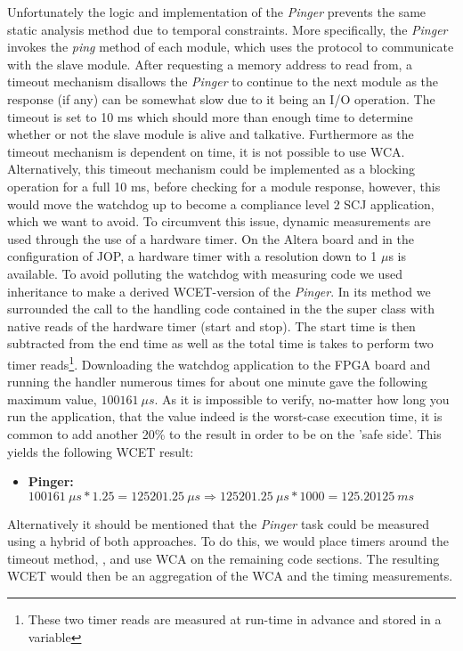 Unfortunately the logic and implementation of the \textit{Pinger} prevents the same static analysis method due to temporal constraints. More specifically, the \textit{Pinger} invokes the \textit{ping} method of each module, which uses the \iic protocol to communicate with the slave module. After requesting a memory address to read from, a timeout mechanism disallows the \textit{Pinger} to continue to the next module as the response (if any) can be somewhat slow due to it being an I/O operation. The timeout is set to 10 ms which should more than enough time to determine whether or not the slave module is alive and talkative. Furthermore as the timeout mechanism is dependent on time, it is not possible to use WCA. Alternatively, this timeout mechanism could be implemented as a blocking operation for a full 10 ms, before checking for a module response, however, this would move the watchdog up to become a compliance level 2 SCJ application, which we want to avoid. To circumvent this issue, dynamic measurements are used through the use of a hardware timer. On the Altera board and in the \iic configuration of JOP, a hardware timer with a resolution down to 1 $\mu$s is available. To avoid polluting the watchdog with measuring code we used inheritance to make a derived WCET-version of the \textit{Pinger}. In its  method we surrounded the call to the handling code contained in the the super class with native reads of the hardware timer (start and stop). The start time is then subtracted from the end time as well as the total time is takes to perform two timer reads\footnote{These two timer reads are measured at run-time in advance and stored in a variable}. Downloading the watchdog application to the FPGA board and running the handler numerous times for about one minute gave the following maximum value, $100161\ \mu s $. As it is impossible to verify, no-matter how long you run the application, that the value indeed is the worst-case execution time, it is common to add another 20\% to the result in order to be on the 'safe side'. This yields the following WCET result:

\begin{itemize}
    \item \textbf{Pinger:} $100161\ \mu s * 1.25 = 125201.25\ \mu s \Rightarrow 125201.25\ \mu s * 1000 = 125.20125\ ms$
\end{itemize}

Alternatively it should be mentioned that the \textit{Pinger} task could be measured using a hybrid of both approaches. To do this, we would place timers around the timeout method, , and use WCA on the remaining code sections. The resulting WCET would then be an aggregation of the WCA and the timing measurements. 

